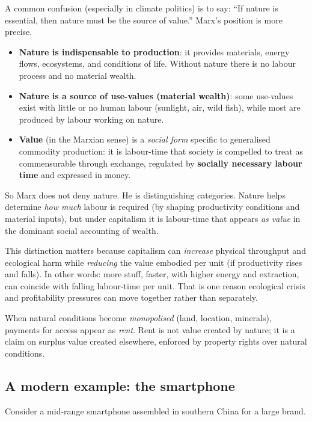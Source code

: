 A common confusion (especially in climate politics) is to say: ``If nature is essential,
then nature must be the source of value.'' Marx’s position is more precise.

\begin{itemize}[leftmargin=1.5em]
  \item \textbf{Nature is indispensable to production}: it provides materials, energy flows,
  ecosystems, and conditions of life. Without nature there is no labour process and no material wealth.
  \item \textbf{Nature is a source of use-values (material wealth)}: some use-values exist with little or
  no human labour (sunlight, air, wild fish), while most are produced by labour working on nature.
  \item \textbf{Value} (in the Marxian sense) is a \emph{social form} specific to generalised commodity
  production: it is labour-time that society is compelled to treat as commensurable through exchange,
  regulated by \textbf{socially necessary labour time} and expressed in money.
\end{itemize}

So Marx does not deny nature. He is distinguishing categories. Nature helps determine \emph{how much}
labour is required (by shaping productivity conditions and material inputs), but under capitalism it is
labour-time that appears \emph{as value} in the dominant social accounting of wealth.

This distinction matters because capitalism can \emph{increase} physical throughput and ecological harm
while \emph{reducing} the value embodied per unit (if productivity rises and \snlt{} falls). In other words:
more stuff, faster, with higher energy and extraction, can coincide with falling labour-time per unit. That
is one reason ecological crisis and profitability pressures can move together rather than separately.

When natural conditions become \emph{monopolised} (land, location, minerals), payments for access appear as
\emph{rent}. Rent is not value created by nature; it is a claim on surplus value created elsewhere, enforced
by property rights over natural conditions.\cite{Marx1894}


\subsection{A modern example: the smartphone}

Consider a mid-range smartphone assembled in southern China for a large
brand.\cite{DedrickKraemerLinden2010,Smith2016}


